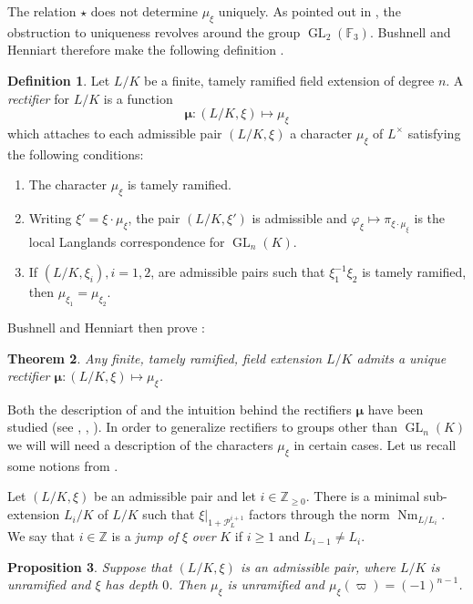 \documentclass[11pt]{amsart}
\theoremstyle{plain}
\newtheorem{theorem}{Theorem}[section]
\newtheorem{proposition}[theorem]{Proposition}
\theoremstyle{definition}
\newtheorem{definition}[theorem]{Definition}
\DeclareMathOperator{\Nm}{Nm}
\DeclareMathOperator{\GL}{GL}
\newcommand{\PL}{\mathcal{P}_L}
\newcommand{\ZZ}{\mathbb{Z}}
\newcommand{\bmu}{\boldsymbol\mu}
\begin{document}
The relation $\star$ does not determine $\mu_{\xi}$ uniquely.  As pointed out
in \cite{bushnell-henniart:10a}, the obstruction to uniqueness revolves around the
group $\GL_2(\mathbb{F}_3)$.  Bushnell and Henniart therefore make the following definition \cite[Def. 1]{bushnell-henniart:10a}.

\begin{definition}\label{rectifierbushnellhenniart}
Let $L/K$ be a finite, tamely ramified field extension of degree $n$.  A \emph{rectifier}
for $L/K$ is a function
$$\bmu : (L/K, \xi) \mapsto \mu_{\xi}$$
which attaches to each admissible pair $(L/K, \xi)$ a character $\mu_{\xi}$ of $L^{\times}$
satisfying the following conditions:
\begin{enumerate}
\item The character $\mu_{\xi}$ is tamely ramified.
\item Writing $\xi' = \xi \cdot \mu_{\xi}$, the pair $(L/K, \xi')$ is admissible and
$\varphi_{\xi} \mapsto \pi_{\xi \cdot \mu_{\xi}}$ is the local Langlands correspondence
for $\GL_n(K)$.
\item If $(L/K, \xi_i), i = 1,2$, are admissible pairs such that $\xi_1^{-1} \xi_2$ is
tamely ramified, then $ \mu_{\xi_1} =  \mu_{\xi_2}$.
\end{enumerate}
\end{definition}

Bushnell and Henniart then prove \cite[Thm. A]{bushnell-henniart:10a}:

\begin{theorem}
Any finite, tamely ramified, field extension $L/K$ admits a unique rectifier
$\bmu : (L/K, \xi) \mapsto \mu_{\xi}$.
\end{theorem}

Both the description of and the
intuition behind the rectifiers $\bmu$ have been
studied (see \cite{bushnell-henniart:10a}, \cite{tam:12a}, \cite{adrian:13a}).  In order to
generalize rectifiers to groups other than $\GL_n(K)$ we
will will need a description of the characters $\mu_{\xi}$ in certain cases.
Let us recall some notions from \cite[\S8]{bushnell-henniart:10a}.

Let $(L/K,\xi)$ be an admissible pair and let $i \in \ZZ_{\ge 0}$.
There is a minimal sub-extension $L_i/K$ of $L/K$ such that
$\xi|_{1 + \PL^{i+1}}$ factors through the norm $\Nm_{L/L_i}$.  We say that $i \in \mathbb{Z}$
is a \emph{jump of} $\xi$ \emph{over} $K$ if $i \geq 1$ and $L_{i-1} \neq L_i$.

\begin{proposition}\label{prop:BH_result1}
  Suppose that $(L/K, \xi)$ is an admissible pair, where $L/K$
  is unramified and $\xi$ has depth $0$.
  Then $\mu_{\xi}$ is unramified and
  $\mu_{\xi}(\varpi) = (-1)^{n-1}$.
\end{proposition}
\end{document}
